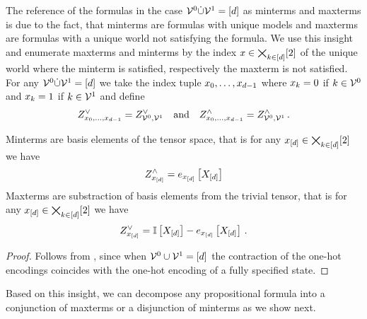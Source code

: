 	
%
The reference of the formulas in the case $\mathcal{V}^{0}\dot{\cup}\mathcal{V}^{1} = [d]$ as minterms and maxterms is due to the fact, that minterms are formulas with unique models and maxterms are formulas with a unique world not satisfying the formula.
We use this insight and enumerate maxterms and minterms by the index $x\in\bigtimes_{k\in[d]}[2]$ of the unique world where the minterm is satisfied, respectively the maxterm is not satisfied.
For any $\mathcal{V}^{0}\dot{\cup}\mathcal{V}^{1} = [d]$ we take the index tuple $x_{0},\ldots,x_{d-1}$ where $x_{k}=0$ if $k\in\mathcal{V}^{0}$ and $x_{k}=1$ if $k\in\mathcal{V}^{1}$ and define
\begin{align*}
	Z^{\lor}_{x_{0},\ldots,x_{d-1}} = Z^{\lor}_{\mathcal{V}^{0},\mathcal{V}^{1}} \quad \text{and} \quad Z^{\land}_{x_{0},\ldots,x_{d-1}} = Z^{\land}_{\mathcal{V}^{0},\mathcal{V}^{1}} \, .
\end{align*}


\begin{corollary}
	Minterms are basis elements of the tensor space, that is for any $x_{[d]}\in\bigtimes_{k\in[d]}[2]$ we have
	\begin{align*}
		Z^{\land}_{x_{[d]}} = e_{x_{[d]}}\left[X_{[d]}\right]
	\end{align*}
	Maxterms are substraction of basis elements from the trivial tensor, that is for any $x_{[d]}\in\bigtimes_{k\in[d]}[2]$ we have
	\begin{align*}
		Z^{\lor}_{x_{[d]}} = \mathbb{I}\left[X_{[d]}\right] - e_{x_{[d]}}\left[X_{[d]}\right]  \, .
	\end{align*}
\end{corollary}
\begin{proof}
	Follows from , since when $\mathcal{V}^{0}\cup\mathcal{V}^{1} = [d]$ the contraction of the one-hot encodings coincides with the one-hot encoding of a fully specified state.
\end{proof}


Based on this insight, we can decompose any propositional formula into a conjunction of maxterms or a disjunction of minterms as we show next.

